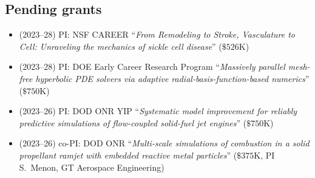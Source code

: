 \subsection{Pending grants}

\begin{itemize}
    \item (2023--28) PI: NSF CAREER ``\textit{From Remodeling to Stroke, Vasculature to Cell: Unraveling the mechanics of sickle cell disease}'' ($\$526$K)
    \item (2023--28) PI: DOE Early Career Research Program ``\textit{Massively parallel mesh-free hyperbolic PDE solvers via adaptive radial-basis-function-based numerics}'' ($\$750$K)
    \item (2023--26) PI: DOD ONR YIP ``\textit{Systematic model improvement for reliably predictive simulations of flow-coupled solid-fuel jet engines}'' ($\$750$K)
    \item (2023--26) co-PI: DOD ONR ``\textit{Multi-scale simulations of combustion in a solid propellant ramjet with embedded reactive metal particles}'' ($\$375$K, PI S.\ Menon, GT Aerospace Engineering)
\end{itemize}
